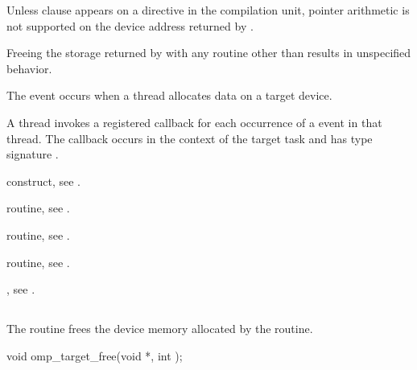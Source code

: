 \begin{ccppspecific}
Unless  clause appears on a 
directive in the compilation unit, pointer arithmetic is not supported
on the device address returned by .
\end{ccppspecific}

Freeing the storage returned by  with any routine
other than  results in unspecified behavior.

\events
The  event occurs when a thread allocates 
data on a target device.

\tools
A thread invokes a registered 
callback for each occurrence of a  event in that thread.
The callback occurs in the context of the target task and has type signature
.

\begin{crossrefs}
\item {} construct, see
.

\item {} routine, see
.

\item {} routine, see
.

\item {} routine, see
.

\item {}, see
.
\end{crossrefs}



\subsection{}
\label{subsec:omp_target_free}
\summary
The  routine frees the device memory allocated 
by the  routine.

\format
\begin{ccppspecific}
\begin{ompcFunction}
void omp_target_free(void *, int );
\end{ompcFunction}
\end{ccppspecific}

